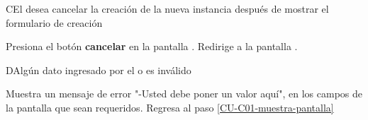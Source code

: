 \begin{UCtrayectoriaA}%
  {C}{El  desea cancelar la creación de la nueva instancia después de mostrar el formulario de creación}

  \Actor Presiona el botón {\bf cancelar} en la pantalla .
  \Sistema Redirige a la pantalla .

\end{UCtrayectoriaA}

\begin{UCtrayectoriaA}{D}{Algún dato ingresado por el  o  es inválido}

  \Sistema Muestra un mensaje de error "-Usted debe poner un valor aquí", en los campos de la pantalla  que sean requeridos.
  \Sistema Regresa al paso \ref{CU-C01-muestra-pantalla}

\end{UCtrayectoriaA}
